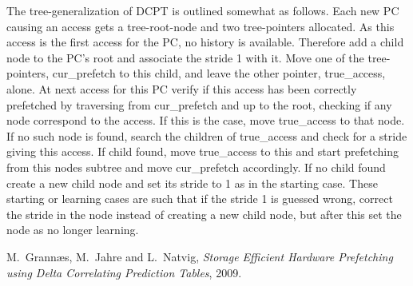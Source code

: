 \documentclass[12pt,journal,compsoc]{IEEEtran}
\begin{document}
The tree-generalization of DCPT is outlined somewhat as follows. Each new PC
causing an access gets a tree-root-node and two tree-pointers allocated.
As this access is the first access for the PC, no history is available.
Therefore add a child node to the PC's root and associate the stride 1 with it.
Move one of the tree-pointers, cur\_prefetch to this child, and leave the other
pointer, true\_access, alone. At next access for this PC verify if this access
has been correctly prefetched by traversing from cur\_prefetch and up to the
root, checking if any node correspond to the access. If this is the case,
move true\_access to that node. If no such node is found, search the children
of true\_access and check for a stride giving this access. If child found, move
true\_access to this and start prefetching from this nodes subtree and move
cur\_prefetch accordingly. If no child found create a new child node and set
its stride to 1 as in the starting case. These starting or learning cases
are such that if the stride 1 is guessed wrong, correct the stride in the node
instead of creating a new child node, but after this set the node as no longer
learning.

\ifCLASSOPTIONcompsoc
\else
\fi


\ifCLASSOPTIONcaptionsoff
  \newpage
\fi



\begin{thebibliography}{1}

M.~Grann\ae s, M.~Jahre and L.~Natvig, \emph{Storage Efficient Hardware Prefetching using Delta Correlating Prediction Tables}, 2009.

\end{thebibliography}



\end{document}
